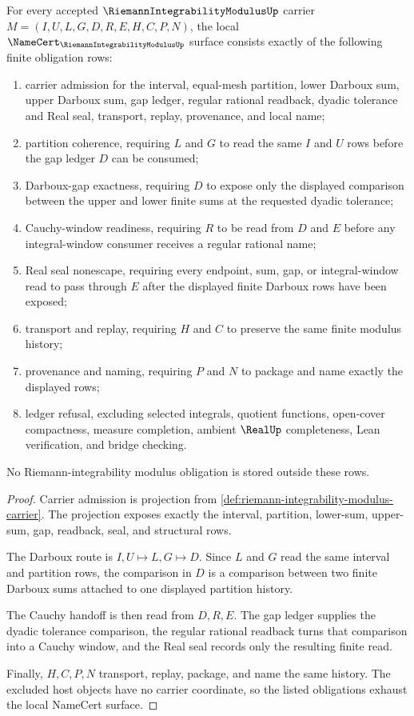 \begin{theorem}
\label{thm:riemann-integrability-modulus-namecert-obligations}
For every accepted $\RiemannIntegrabilityModulusUp$ carrier $M=(I,U,L,G,D,R,E,H,C,P,N)$, the local $\NameCert_{\RiemannIntegrabilityModulusUp}$ surface consists exactly of the following finite obligation rows:
\begin{enumerate}
\item carrier admission for the interval, equal-mesh partition, lower Darboux sum, upper Darboux sum, gap ledger, regular rational readback, dyadic tolerance and Real seal, transport, replay, provenance, and local name;
\item partition coherence, requiring $L$ and $G$ to read the same $I$ and $U$ rows before the gap ledger $D$ can be consumed;
\item Darboux-gap exactness, requiring $D$ to expose only the displayed comparison between the upper and lower finite sums at the requested dyadic tolerance;
\item Cauchy-window readiness, requiring $R$ to be read from $D$ and $E$ before any integral-window consumer receives a regular rational name;
\item Real seal nonescape, requiring every endpoint, sum, gap, or integral-window read to pass through $E$ after the displayed finite Darboux rows have been exposed;
\item transport and replay, requiring $H$ and $C$ to preserve the same finite modulus history;
\item provenance and naming, requiring $P$ and $N$ to package and name exactly the displayed rows;
\item ledger refusal, excluding selected integrals, quotient functions, open-cover compactness, measure completion, ambient $\RealUp$ completeness, Lean verification, and bridge checking.
\end{enumerate}
No Riemann-integrability modulus obligation is stored outside these rows.
\end{theorem}
\begin{proof}
Carrier admission is projection from \autoref{def:riemann-integrability-modulus-carrier}. The projection exposes exactly the interval, partition, lower-sum, upper-sum, gap, readback, seal, and structural rows.

The Darboux route is $I,U\mapsto L,G\mapsto D$. Since $L$ and $G$ read the same interval and partition rows, the comparison in $D$ is a comparison between two finite Darboux sums attached to one displayed partition history.

The Cauchy handoff is then read from $D,R,E$. The gap ledger supplies the dyadic tolerance comparison, the regular rational readback turns that comparison into a Cauchy window, and the Real seal records only the resulting finite read.

Finally, $H,C,P,N$ transport, replay, package, and name the same history. The excluded host objects have no carrier coordinate, so the listed obligations exhaust the local NameCert surface.
\end{proof}

